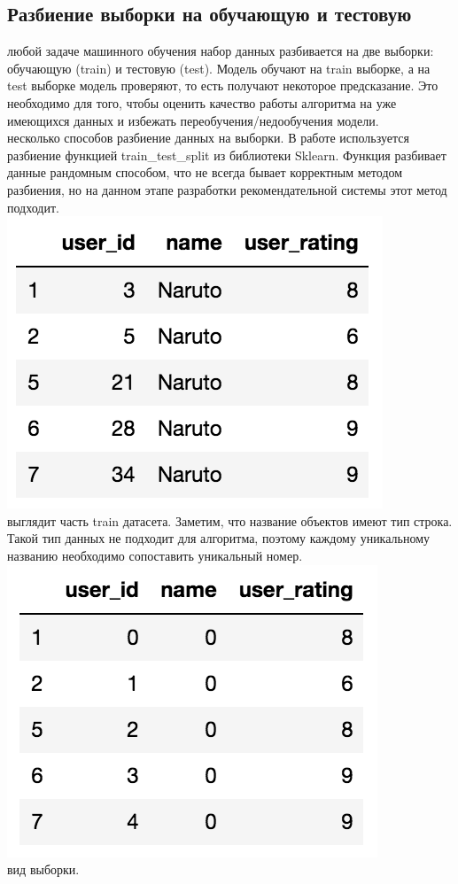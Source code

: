 \documentclass{article}
\newcommand\tab[1][1cm]{\hspace*{#1}}
\begin{document}
\subsection{Разбиение выборки на обучающую и тестовую}
 любой задаче машинного обучения набор данных разбивается на две выборки: обучающую (train) и тестовую (test). Модель обучают на train выборке, а на test выборке модель проверяют, то есть получают некоторое предсказание. Это необходимо для того, чтобы оценить качество работы алгоритма на уже имеющихся данных и избежать переобучения/недообучения модели. \\
 несколько способов разбиение данных на выборки. В работе используется разбиение функцией train\_test\_split из библиотеки Sklearn. Функция разбивает данные рандомным способом, что не всегда бывает корректным методом разбиения, но на данном этапе разработки рекомендательной системы этот метод подходит.\\
\includegraphics[scale=0.6]{f9.png}\\
 выглядит часть train датасета. Заметим, что название объектов имеют тип строка. Такой тип данных не подходит для алгоритма, поэтому каждому уникальному названию необходимо сопоставить уникальный номер.
\includegraphics[scale=0.6]{f10.png}\\
 вид выборки.
\end{document}
